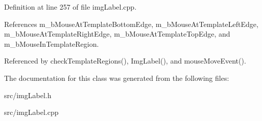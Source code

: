 Definition at line 257 of file imgLabel.cpp.

References m\_\-bMouseAtTemplateBottomEdge, m\_\-bMouseAtTemplateLeftEdge, m\_\-bMouseAtTemplateRightEdge, m\_\-bMouseAtTemplateTopEdge, and m\_\-bMouseInTemplateRegion.

Referenced by checkTemplateRegions(), ImgLabel(), and mouseMoveEvent().

The documentation for this class was generated from the following files:\begin{CompactItemize}
\item 
src/imgLabel.h\item 
src/imgLabel.cpp\end{CompactItemize}
